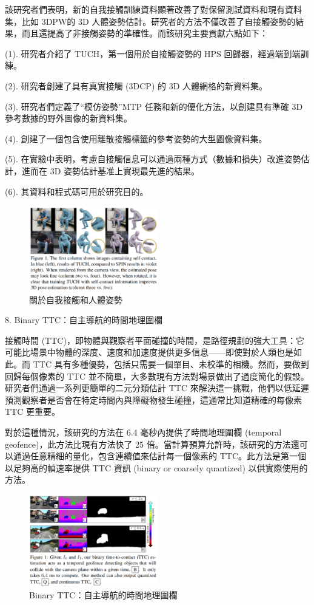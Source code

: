 \documentclass[10pt,UTF8]{ctexart}
\begin{document}
該研究者們表明，新的自我接觸訓練資料顯著改善了對保留測試資料和現有資料集，比如 3DPW的 3D 人體姿勢估計。研究者的方法不僅改善了自接觸姿勢的結果，而且還提高了非接觸姿勢的準確性。而該研究主要貢獻六點如下：
 
(1). 研究者介紹了 TUCH，第一個用於自接觸姿勢的 HPS 回歸器，經過端到端訓練。

(2). 研究者創建了具有真實接觸 (3DCP) 的 3D 人體網格的新資料集。

(3). 研究者們定義了“模仿姿勢”MTP 任務和新的優化方法，以創建具有準確 3D 參考數據的野外圖像的新資料集。

(4). 創建了一個包含使用離散接觸標籤的參考姿勢的大型圖像資料集。

(5). 在實驗中表明，考慮自接觸信息可以通過兩種方式（數據和損失）改進姿勢估計，進而在 3D 姿勢估計基准上實現最先進的結果。

(6). 其資料和程式碼可用於研究目的。

\begin{figure}[H]
\centering 
\includegraphics[width=0.50\textwidth]{r7.png} 
\caption{關於自我接觸和人體姿勢}
\label{Test}
\end{figure}

8. Binary TTC：自主導航的時間地理圍欄

接觸時間 (TTC)，即物體與觀察者平面碰撞的時間，是路徑規劃的強大工具：它可能比場景中物體的深度、速度和加速度提供更多信息——即使對於人類也是如此。而 TTC 具有多種優勢，包括只需要一個單目、未校準的相機。然而，要做到回歸每個像素的 TTC 並不簡單，大多數現有方法對場景做出了過度簡化的假設。研究者們通過一系列更簡單的二元分類估計 TTC 來解決這一挑戰，他們以低延遲預測觀察者是否會在特定時間內與障礙物發生碰撞，這通常比知道精確的每像素 TTC 更重要。

對於這種情況，該研究的方法在 6.4 毫秒內提供了時間地理圍欄 (temporal geofence)，此方法比現有方法快了 25 倍。當計算預算允許時，該研究的方法還可以通過任意精細的量化，包含連續值來估計每一個像素的 TTC。此方法是第一個以足夠高的幀速率提供 TTC 資訊 (binary or coarsely quantized) 以供實際使用的方法。

\begin{figure}[H]
\centering 
\includegraphics[width=0.50\textwidth]{r8.png} 
\caption{Binary TTC：自主導航的時間地理圍欄}
\label{Test}
\end{figure}
\end{document}
